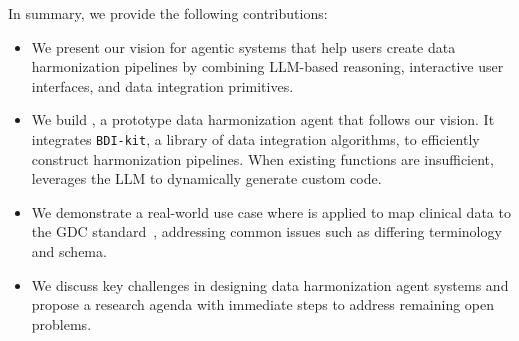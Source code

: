 In summary, we provide the following contributions:
\vspace{-0.25em}
\begin{itemize}  
    \item We present our vision for agentic systems that help users create data harmonization pipelines by combining LLM-based reasoning, interactive user interfaces, and data integration primitives.
    \item We build \systemname, a prototype data harmonization agent that follows our vision. It integrates \texttt{BDI-kit}, a library of data integration algorithms, to efficiently construct harmonization pipelines. When existing functions are insufficient, \systemname leverages the LLM to dynamically generate custom code.  
    \item We demonstrate a real-world use case where \systemname is applied to map clinical data to the GDC standard~\cite{gdc}, addressing common issues such as differing terminology and schema.
    \item We discuss key challenges in designing data harmonization agent systems and propose a research agenda with immediate steps to address remaining open problems.  
\end{itemize}